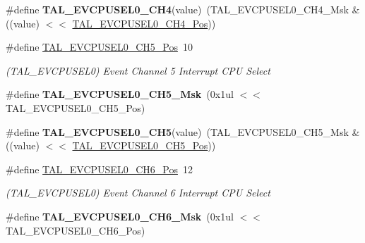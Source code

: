 \begin{DoxyCompactItemize}
\item 
\hypertarget{group___s_a_m_l21___t_a_l_gae46af9c3f703eb8a2cb4f759572bb8d2}{}\#define {\bfseries T\+A\+L\+\_\+\+E\+V\+C\+P\+U\+S\+E\+L0\+\_\+\+C\+H4}(value)~(T\+A\+L\+\_\+\+E\+V\+C\+P\+U\+S\+E\+L0\+\_\+\+C\+H4\+\_\+\+Msk \& ((value) $<$$<$ \hyperlink{group___s_a_m_l21___t_a_l_ga68583ceefef14985b7331eb1c2c1e353}{T\+A\+L\+\_\+\+E\+V\+C\+P\+U\+S\+E\+L0\+\_\+\+C\+H4\+\_\+\+Pos}))\label{group___s_a_m_l21___t_a_l_gae46af9c3f703eb8a2cb4f759572bb8d2}

\item 
\hypertarget{group___s_a_m_l21___t_a_l_ga8c5cdfd91f056354e80a40dd0e6b8377}{}\#define \hyperlink{group___s_a_m_l21___t_a_l_ga8c5cdfd91f056354e80a40dd0e6b8377}{T\+A\+L\+\_\+\+E\+V\+C\+P\+U\+S\+E\+L0\+\_\+\+C\+H5\+\_\+\+Pos}~10\label{group___s_a_m_l21___t_a_l_ga8c5cdfd91f056354e80a40dd0e6b8377}

\begin{DoxyCompactList}\small\item\em (T\+A\+L\+\_\+\+E\+V\+C\+P\+U\+S\+E\+L0) Event Channel 5 Interrupt C\+P\+U Select \end{DoxyCompactList}\item 
\hypertarget{group___s_a_m_l21___t_a_l_ga2669a01f60fdc4efe8407fff45943b0f}{}\#define {\bfseries T\+A\+L\+\_\+\+E\+V\+C\+P\+U\+S\+E\+L0\+\_\+\+C\+H5\+\_\+\+Msk}~(0x1ul $<$$<$ T\+A\+L\+\_\+\+E\+V\+C\+P\+U\+S\+E\+L0\+\_\+\+C\+H5\+\_\+\+Pos)\label{group___s_a_m_l21___t_a_l_ga2669a01f60fdc4efe8407fff45943b0f}

\item 
\hypertarget{group___s_a_m_l21___t_a_l_ga711655e4b2217ce3cca93fb85f9a0ec4}{}\#define {\bfseries T\+A\+L\+\_\+\+E\+V\+C\+P\+U\+S\+E\+L0\+\_\+\+C\+H5}(value)~(T\+A\+L\+\_\+\+E\+V\+C\+P\+U\+S\+E\+L0\+\_\+\+C\+H5\+\_\+\+Msk \& ((value) $<$$<$ \hyperlink{group___s_a_m_l21___t_a_l_ga8c5cdfd91f056354e80a40dd0e6b8377}{T\+A\+L\+\_\+\+E\+V\+C\+P\+U\+S\+E\+L0\+\_\+\+C\+H5\+\_\+\+Pos}))\label{group___s_a_m_l21___t_a_l_ga711655e4b2217ce3cca93fb85f9a0ec4}

\item 
\hypertarget{group___s_a_m_l21___t_a_l_gaa2ea00b54043fbb66325a0e72d95e509}{}\#define \hyperlink{group___s_a_m_l21___t_a_l_gaa2ea00b54043fbb66325a0e72d95e509}{T\+A\+L\+\_\+\+E\+V\+C\+P\+U\+S\+E\+L0\+\_\+\+C\+H6\+\_\+\+Pos}~12\label{group___s_a_m_l21___t_a_l_gaa2ea00b54043fbb66325a0e72d95e509}

\begin{DoxyCompactList}\small\item\em (T\+A\+L\+\_\+\+E\+V\+C\+P\+U\+S\+E\+L0) Event Channel 6 Interrupt C\+P\+U Select \end{DoxyCompactList}\item 
\hypertarget{group___s_a_m_l21___t_a_l_gafac0be5d69c9218c11e15e1662644442}{}\#define {\bfseries T\+A\+L\+\_\+\+E\+V\+C\+P\+U\+S\+E\+L0\+\_\+\+C\+H6\+\_\+\+Msk}~(0x1ul $<$$<$ T\+A\+L\+\_\+\+E\+V\+C\+P\+U\+S\+E\+L0\+\_\+\+C\+H6\+\_\+\+Pos)\label{group___s_a_m_l21___t_a_l_gafac0be5d69c9218c11e15e1662644442}


\end{DoxyCompactItemize}
